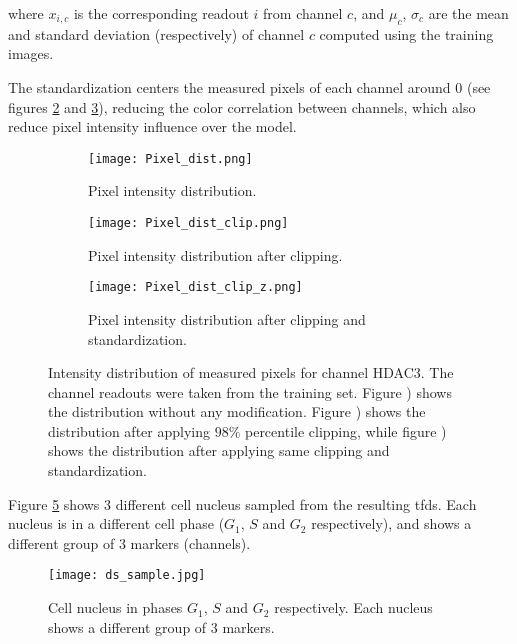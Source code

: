 \noindent where $x_{i,c}$ is the corresponding readout $i$ from channel $c$, and $\mu_c$, $\sigma_c$ are the mean and standard deviation (respectively) of channel $c$ computed using the training images.

The standardization centers the measured pixels of each channel around 0 (see figures \ref{fig:data_pp:pixel_dist:clip} and \ref{fig:data_pp:pixel_dist:clip_z}), reducing the color correlation between channels, which also reduce pixel intensity influence over the model.

\begin{figure}[htb]
  \centering
  \begin{subfigure}[t]{.29\linewidth}
    \texttt{[image: Pixel\_dist.png]}
    \caption{Pixel intensity distribution.}
    \label{fig:data_pp:pixel_dist:ori}
  \end{subfigure}
  \hspace{4mm}
  \begin{subfigure}[t]{.3\linewidth}
    \texttt{[image: Pixel\_dist\_clip.png]}
    \caption{Pixel intensity distribution after clipping.}
    \label{fig:data_pp:pixel_dist:clip}
  \end{subfigure}
  \hspace{4mm}
  \begin{subfigure}[t]{.28\linewidth}
    \texttt{[image: Pixel\_dist\_clip\_z.png]}
    \caption{Pixel intensity distribution after clipping and standardization.}
    \label{fig:data_pp:pixel_dist:clip_z}
  \end{subfigure}
  \caption{Intensity distribution of measured pixels for channel HDAC3. The channel readouts were taken from the training set. Figure ) shows the distribution without any modification. Figure ) shows the distribution after applying $98\%$ percentile clipping, while figure ) shows the distribution after applying same clipping and standardization.}
  \label{fig:data_pp:pixel_dist}
\end{figure}

Figure \ref{fig:data_pp:cell_sample} shows 3 different cell nucleus sampled from the resulting \gls{tfds}. Each nucleus is in a different cell phase ($G_1$, $S$ and $G_2$ respectively), and shows a different group of 3 markers (channels).

\begin{figure}[htb]
  \centering
  \texttt{[image: ds\_sample.jpg]}
  \caption{Cell nucleus in phases $G_1$, $S$ and $G_2$ respectively. Each nucleus shows a different group of 3 markers.}
  \label{fig:data_pp:cell_sample}
\end{figure}
